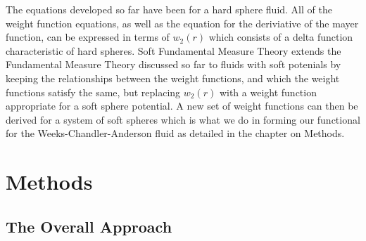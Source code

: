 \documentclass[double,12pt]{beavtex}
\begin{document}
The equations developed so far have been for a hard sphere fluid. All of 
the weight function equations, as well as the equation for the deriviative 
of the mayer function, can be expressed in terms of $w_{2}(r)$ which consists 
of a delta function characteristic of hard spheres. Soft Fundamental Measure 
Theory extends the Fundamental Measure Theory discussed so far to 
fluids with soft potenials by keeping the relationships between the weight 
functions, and which the weight functions satisfy the same, but replacing 
$w_{2}(r)$ with a weight function appropriate for a soft sphere potential. 
A new set of weight functions can then be derived for a system of soft 
spheres which is what we do in forming our functional for the 
Weeks-Chandler-Anderson fluid as detailed in the chapter on Methods.

\chapter{Methods}

\section{The Overall Approach}
%
\end{document}
